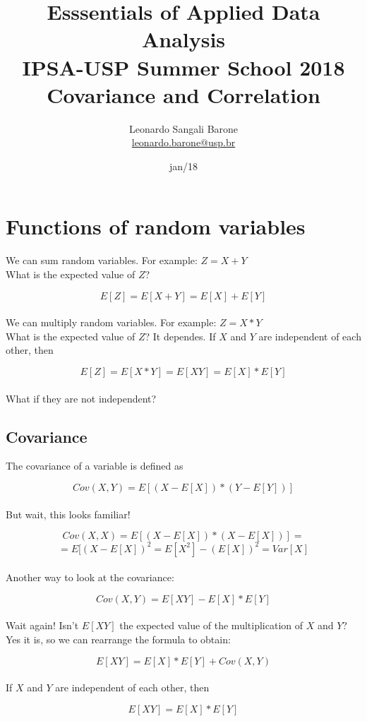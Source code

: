\documentclass[11pt]{article}
\title{\textbf{Esssentials of Applied Data Analysis\\
				IPSA-USP Summer School 2018}\newline\\
				Covariance and Correlation}
\author{Leonardo Sangali Barone\\ \href{leonardo.barone@usp.br}{leonardo.barone@usp.br}}
\date{jan/18}
\begin{document}
\maketitle

\section*{Functions of random variables}

	We can sum random variables. For example: $Z=X+Y$\\

	What is the expected value of $Z$?

	\[E[Z] = E[X+Y] = E[X] + E[Y]\]\\

	We can multiply random variables. For example: $Z=X*Y$\\
	
	What is the expected value of $Z$? It dependes. If $X$ and $Y$ are independent of each other, then	

	\[E[Z] = E[X*Y] =E[XY] = E[X] * E[Y]\]\\

	What if they are not independent?

	\subsection*{Covariance}
	
	The covariance of a variable is defined as
	
	\[Cov(X,Y) = E[(X-E[X]) * (Y-E[Y])]\]\\
	
	But wait, this looks familiar!
	
	\[Cov(X,X) = E[(X-E[X]) * (X-E[X])] = \]
	\[= E[(X-E[X])^2 = E[X^2] - (E[X])^2 = Var[X]\]\\

	Another way to look at the covariance:
	
	\[Cov(X,Y) = E[XY] - E[X]*E[Y]\]\\

	Wait again! Isn't $E[XY]$ the expected value of the multiplication of $X$ and $Y$? Yes it is, so we can rearrange the formula to obtain:

	\[E[XY] = E[X]*E[Y] + Cov(X,Y)\]\\

	If $X$ and $Y$ are independent of each other, then 

	\[E[XY] = E[X]*E[Y]\]\\
\end{document}
